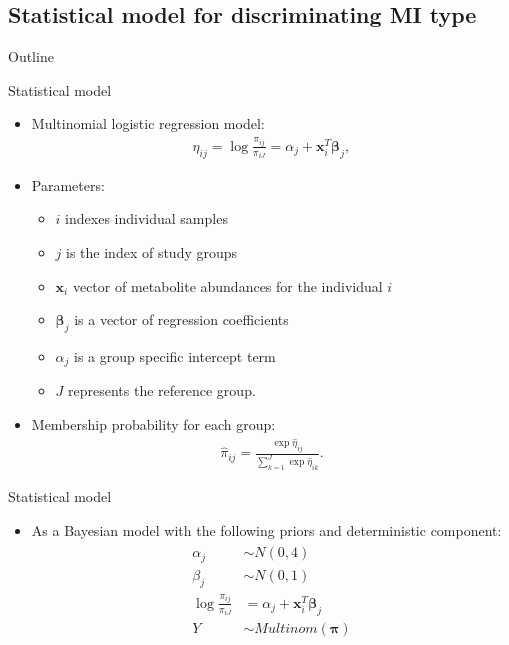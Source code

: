 \documentclass[xcolor=dvipsnames]{beamer}
\begin{document}
\subsection{Statistical model for discriminating MI type}
\begin{frame}{Outline}
	\vspace{-10.5pt}
	\tableofcontents[currentsection,subsectionstyle=show/shaded/hide]
\end{frame}

\begin{frame}{Statistical model}
	\vspace{-10.5pt}
	\begin{itemize}
		\item Multinomial logistic regression model:
			\begin{align*}
			\eta_{ij} = \log \frac{\pi_{ij}}{\pi_{iJ}} = \alpha_j + \textbf{x}_i^T \boldsymbol{\beta}_j,
			\end{align*} 
		\item Parameters:
		\begin{itemize}
			\item $i$ indexes individual samples
			\item $j$ is the index of study groups
			\item $\textbf{x}_i$ vector of metabolite abundances for the individual $i$
			\item $\boldsymbol{\beta}_j$ is a vector of regression coefficients 
			\item $\alpha_j$ is a group specific intercept term
			\item $J$ represents the reference group.
		\end{itemize}
		\item Membership probability for each group:
		\begin{align*}
		\hat{\pi}_{ij} = \frac{\exp \hat{\eta}_{ij}}{\sum_{k=1}^{J}\exp \hat{\eta}_{ik}}.
		\end{align*}
	\end{itemize}
\end{frame}

\begin{frame}{Statistical model}
	\vspace{-10.5pt}
	\begin{itemize}
		\item As a Bayesian model with the following priors and deterministic component:
		\begin{align*}
		\begin{split}
		\alpha_j &\sim N(0,4) \\
		\beta_j &\sim N(0,1) \\
		\log \frac{\pi_{ij}}{\pi_{iJ}} &= \alpha_j + \textbf{x}_i^T \boldsymbol{\beta}_j \\
		Y &\sim Multinom(\boldsymbol{\pi})
		\end{split}
		\end{align*}
	\end{itemize}
\end{frame}
\end{document}
